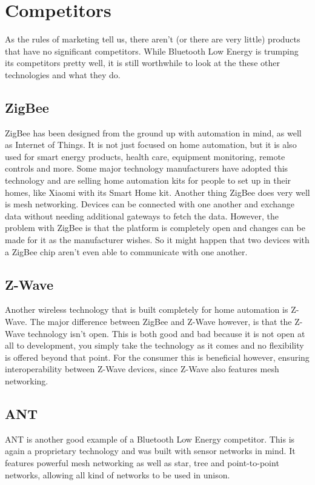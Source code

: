 \documentclass[pdftex,a4paper,12pt,twoside]{report}
\begin{document}
\section{Competitors}
\label{sec:competitors}
As the rules of marketing tell us, there aren't (or there are very little) products that have no significant competitors. While Bluetooth Low Energy is trumping its competitors pretty well, it is still worthwhile to look at the these other technologies and what they do.

\subsection{ZigBee}
\label{subsec:zigbee}
ZigBee has been designed from the ground up with automation in mind, as well as Internet of Things. It is not just focused on home automation, but it is also used for smart energy products, health care, equipment monitoring, remote controls and more. Some major technology manufacturers have adopted this technology and are selling home automation kits for people to set up in their homes, like Xiaomi with its Smart Home kit. Another thing ZigBee does very well is mesh networking. Devices can be connected with one another and exchange data without needing additional gateways to fetch the data. However, the problem with ZigBee is that the platform is completely open and changes can be made for it as the manufacturer wishes. So it might happen that two devices with a ZigBee chip aren't even able to communicate with one another.

\subsection{Z-Wave}
\label{subsec:zwave}
Another wireless technology that is built completely for home automation is Z-Wave. The major difference between ZigBee and Z-Wave however, is that the Z-Wave technology isn't open. This is both good and bad because it is not open at all to development, you simply take the technology as it comes and no flexibility is offered beyond that point. For the consumer this is beneficial however, ensuring interoperability between Z-Wave devices, since Z-Wave also features mesh networking.

\subsection{ANT}
\label{subsec:ant}
ANT is another good example of a Bluetooth Low Energy competitor. This is again a proprietary technology and was built with sensor networks in mind. It features powerful mesh networking as well as star, tree and point-to-point networks, allowing all kind of networks to be used in unison.
\end{document}
